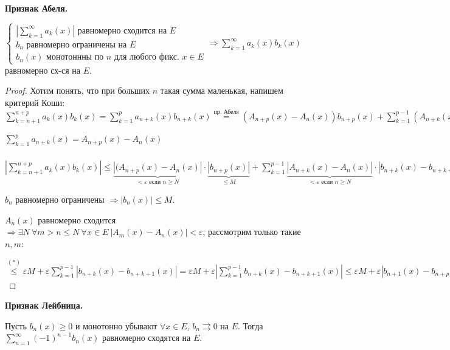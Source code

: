 \begin{theorem}
    \textbf{Признак Абеля.}

    $\left\{\begin{array}{l}
        |\sum\limits_{k=1}^\infty a_k(x)|\text{ равномерно сходится на }E\\
         b_n\text{ равномерно ограничены на }E\\
         b_n(x)\text{ монотоннны по }n\text{ для любого фикс. }x\in E
    \end{array}\right.\Rightarrow \sum\limits_{k=1}^\infty a_k(x)b_k(x)$ равномерно сх-ся на $E$.
\end{theorem}

\begin{proof}
    Хотим понять, что при больших $n$ такая сумма маленькая, напишем критерий Коши: $\sum\limits_{k=n+1}^{n+p}a_k(x)b_k(x)=\sum\limits_{k=1}^pa_{n+k}(x)b_{n+k}(x)\overset{\text{пр. Абеля}}{=}(A_{n+p}(x)-A_n(x))b_{n+p}(x)+\sum\limits_{k=1}^{p-1}(A_{n+k}(x)-A_n(x))(b_{n+k}(x)-b_{n+k+1}(x))$

    $\sum\limits_{k=1}^p a_{n+k}(x)=A_{n+p}(x)-A_n(x)$

    $|\sum\limits_{k=n+1}^{n+p}a_k(x)b_k(x)|\leq \underbrace{|(A_{n+p}(x)-A_n(x)|}_{< \varepsilon\text{ если } n\geq N}\cdot \underbrace{|b_{n+p}(x)|}_{\leq M}+\sum\limits_{k=1}^{p-1}\underbrace{|A_{n+k}(x)-A_n(x)|}_{< \varepsilon\text{ если }n\geq N}\cdot |b_{n+k}(x)-b_{n+k+1}(x)|\overset{(*)}{\leq}$

    $b_n$ равномерно ограничены $\Rightarrow |b_n(x)|\leq M$.

    $A_n(x)$ равномерно сходится $\Rightarrow\exists N\ \forall m> n\leq N\ \forall x\in E\ |A_m(x)- A_n(x)|<\varepsilon $, рассмотрим только такие $n, m$:

    $\overset{(*)}{\leq} \varepsilon M +\varepsilon \sum\limits_{k=1}^{p-1} |b_{n+k}(x)-b_{n+k+1}(x)|=\varepsilon M +\varepsilon| \sum\limits_{k=1}^{p-1} b_{n+k}(x)-b_{n+k+1}(x)|\leq \varepsilon M + \varepsilon|b_{n+1}(x)-b_{n+p+1}(x)|\leq \varepsilon M + 2\varepsilon M=3\varepsilon M$
\end{proof}

\begin{theorem}
    \textbf{Признак Лейбница.}

    Пусть $b_n(x)\geq 0$ и монотонно убывают $\forall x\in E$, $b_n\rightrightarrows 0$ на $E$. Тогда $\sum\limits_{n=1}^\infty (-1)^{n-1}b_n(x)$ равномерно сходятся на $E$.
\end{theorem}

